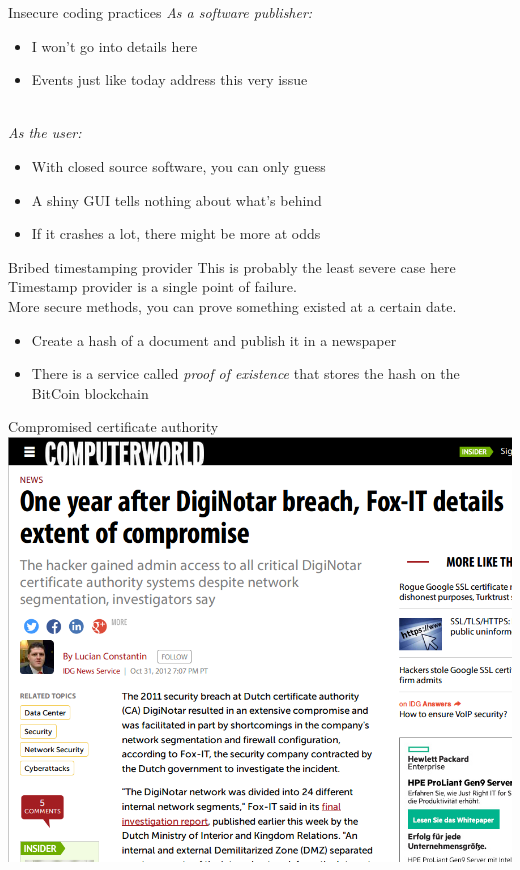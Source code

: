 \documentclass[11pt]{beamer}
\begin{document}
\begin{frame}{Insecure coding practices}
\emph{As a software publisher:}
\begin{itemize}
\item I won't go into details here
\item Events just like today address this very issue
\end{itemize}
\\[0.2cm]
\pause
\emph{As the user:}
\begin{itemize}
\item With closed source software, you can only guess
\item A shiny GUI tells nothing about what's behind
\item If it crashes a lot, there might be more at odds
\end{itemize}
\end{frame}

\begin{frame}{Bribed timestamping provider}
This is probably the least severe case here
\\[0.2cm]
Timestamp provider is a single point of failure.
\\[0.2cm]
More secure methods, you can prove something existed at a certain date.
\\[0.2cm]
\pause
\begin{itemize}
\item Create a hash of a document and publish it in a newspaper
\pause
\item There is a service called \emph{proof of existence} that stores the hash on the BitCoin blockchain
\end{itemize}
\end{frame}

\begin{frame}{Compromised certificate authority}
\includegraphics[scale=0.28]{diginotar.png}
\end{frame}
\end{document}
